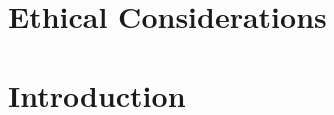\documentclass[12pt]{article}
\begin{document}
\pagebreak

\section*{Ethical Considerations}


\pagebreak

\tableofcontents

\pagebreak


\section{Introduction}



\newpage


\end{document}
